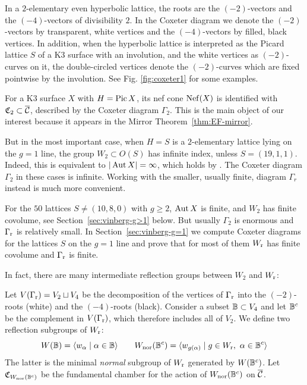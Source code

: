 \documentclass{amsart}
\begin{document}
In a $2$-elementary even hyperbolic lattice, the roots are the
$(-2)$-vectors and the $(-4)$-vectors of divisibility $2$. In the
Coxeter diagram we denote the $(-2)$-vectors by transparent, white
vertices and the $(-4)$-vectors by filled, black vertices. 
In addition, when the hyperbolic lattice is interpreted as the Picard
lattice $S$ of a K3 surface with an involution, and the white vertices
as $(-2)$-curves on it, the double-circled vertices denote the
$(-2)$-curves which are fixed pointwise by the involution.
See Fig. \ref{fig:coxeter1} for some examples.

\medskip

For a K3 surface $X$ with $H=\operatorname{Pic} X$, its nef cone $\operatorname{Nef}(X)$ is
identified with ${\mathfrak C}_2\subset\overline{{\mathcal C}}$,  described by the Coxeter
diagram $\Gamma_2$. This is the main object of our interest because it
appears in the Mirror Theorem~\ref{thm:EF-mirror}.

But in the most important case, when $H=S$ is a $2$-elementary lattice
lying on the $g=1$ line, the group $W_2\subset O(S)$ has infinite
index, unless $S=(19,1,1)$. Indeed, this is equivalent to
$|\operatorname{Aut} X|=\infty$, which holds by
\cite{nikulin1979quotient-groups}. The Coxeter diagram $\Gamma_2$ in
these cases is infinite. Working with the smaller, usually finite,
diagram $\Gamma_r$ instead is much more convenient.

For the $50$ lattices $S\ne(10,8,0)$ with $g\ge2$, $\operatorname{Aut} X$ is finite, and
$W_2$ has finite covolume, see Section~\ref{sec:vinberg-g>1} below.
But usually $\Gamma_2$ is enormous and $\Gamma_{\rm r}$ is relatively small.
In Section~\ref{sec:vinberg-g=1} we compute Coxeter diagrams for the
lattices $S$ on the $g=1$ line and prove that for most of them $W_{\rm r}$
has finite covolume and $\Gamma_{\rm r}$ is finite.

\smallskip

In fact, there are many intermediate reflection groups between
$W_2$ and $W_{\rm r}$:

\begin{definition}\label{def:refl-chambers}
  Let $V(\Gamma_{\rm r}) = V_2 \sqcup V_4$ be the decomposition
  of the vertices of $\Gamma_{\rm r}$ into the $(-2)$-roots (white) and the
  $(-4)$-roots (black).
  Consider a subset ${\mathbb B}\subset V_4$ and let ${\mathbb B}^c$ be the
  complement in $V(\Gamma_{\rm r})$, which therefore includes all of
  $V_2$.  We define two reflection subgroups of $W_{\rm r}$:
  \begin{displaymath}
  W(\bB) = \la w_\alpha \mid \alpha\in\bB \ra
  \qquad
  W\dnor(\bB^c) = \la w_{g(\alpha)} \mid g\in \wref,\ \alpha\in\bB^c  \ra
  \end{displaymath}
  The latter is the minimal \emph{normal} subgroup of $W_{\rm r}$
  generated by $W({\mathbb B}^c)$.
  Let ${\mathfrak C}_{W_{\rm nor}({\mathbb B}^c)}$ be the fundamental chamber for the action of
  $W_{\rm nor}({\mathbb B}^c)$ on $\overline{{\mathcal C}}$.
\end{definition}
\end{document}
